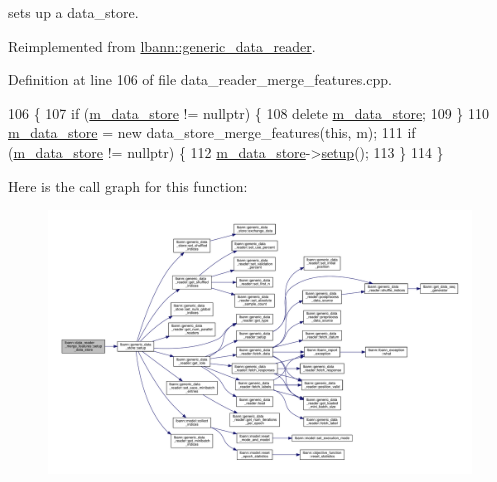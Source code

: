 sets up a data\+\_\+store. 



Reimplemented from \hyperlink{classlbann_1_1generic__data__reader_a8b2a09d38512fc11f1b9d572c89100a7}{lbann\+::generic\+\_\+data\+\_\+reader}.



Definition at line 106 of file data\+\_\+reader\+\_\+merge\+\_\+features.\+cpp.


\begin{DoxyCode}
106                                                           \{
107   \textcolor{keywordflow}{if} (\hyperlink{classlbann_1_1generic__data__reader_aefc076b842933a882214f4f709ca49c9}{m\_data\_store} != \textcolor{keyword}{nullptr}) \{
108     \textcolor{keyword}{delete} \hyperlink{classlbann_1_1generic__data__reader_aefc076b842933a882214f4f709ca49c9}{m\_data\_store};
109   \}
110   \hyperlink{classlbann_1_1generic__data__reader_aefc076b842933a882214f4f709ca49c9}{m\_data\_store} = \textcolor{keyword}{new} data\_store\_merge\_features(\textcolor{keyword}{this}, m);
111   \textcolor{keywordflow}{if} (\hyperlink{classlbann_1_1generic__data__reader_aefc076b842933a882214f4f709ca49c9}{m\_data\_store} != \textcolor{keyword}{nullptr}) \{
112     \hyperlink{classlbann_1_1generic__data__reader_aefc076b842933a882214f4f709ca49c9}{m\_data\_store}->\hyperlink{classlbann_1_1generic__data__store_a1cff17def02ee21b6ca0befeb04bb582}{setup}();
113   \}
114 \}
\end{DoxyCode}
Here is the call graph for this function\+:\nopagebreak
\begin{figure}[H]
\begin{center}
\leavevmode
\includegraphics[width=350pt]{classlbann_1_1data__reader__merge__features_a0ac1ade1b2abddfebe263b6f70a839cc_cgraph}
\end{center}
\end{figure}
